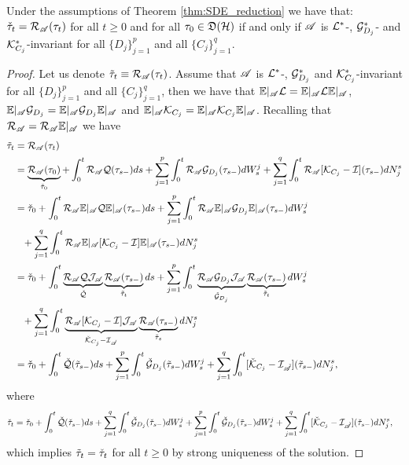 \documentclass[aihp,12pt]{imsart}
\begin{document}
\begin{proposition}
\label{thm:invariant_algebra}
    Under the assumptions of Theorem \ref{thm:SDE_reduction} we have that: $\check{\tau}_t = \mathcal{R}_{\mathscr{A}}(\tau_t)$ for all $t\geq0$ and for all $\tau_0\in\mathfrak{D}(\mathcal{H})$ if and only if $\mathscr{A}$ is  $\mathcal{L}^*$-, $\mathcal{G}_{D_j}^*$- and $\mathcal{K}_{C_j}^*$-invariant for all $\{D_j\}_{j=1}^p$ and all $\{C_j\}_{j=1}^q$. 
\end{proposition}
\begin{proof}
    Let us denote $\Tilde{\tau}_t \equiv \mathcal{R}_{\mathscr{A}}(\tau_t)$. Assume that $\mathscr{A}$ is $\mathcal{L}^*$-, $\mathcal{G}_{D_j}^*$ and $\mathcal{K}_{C_j}^*$-invariant for all $\{D_j\}_{j=1}^p$ and all $\{C_j\}_{j=1}^q$, then we have that $\mathbb{E}|_{\mathscr{A}}  \mathcal{L}  = \mathbb{E}|_{\mathscr{A}}  \mathcal{L}  \mathbb{E}|_{\mathscr{A}}$, $\mathbb{E}|_{\mathscr{A}} \mathcal{G}_{D_j} = \mathbb{E}|_{\mathscr{A}}\mathcal{G}_{D_j}\mathbb{E}|_{\mathscr{A}}$ and $\mathbb{E}|_{\mathscr{A}} \mathcal{K}_{C_j} = \mathbb{E}|_{\mathscr{A}}\mathcal{K}_{C_j}\mathbb{E}|_{\mathscr{A}}$. Recalling that $\mathcal{R}_{\mathscr{A}} = \mathcal{R}_{\mathscr{A}}\mathbb{E}|_{\mathscr{A}}$ we have 
    \begin{align*}
        \Tilde{\tau}_t&=\mathcal{R}_{\mathscr{A}}(\tau_t) \\&= \underbrace{\mathcal{R}_{\mathscr{A}}(\tau_0)}_{\check{\tau}_0} + \int_0^t \mathcal{R}_{\mathscr{A}}\mathcal{Q}(\tau_{s-}) ds + \sum_{j=1}^p \int_0^t \mathcal{R}_{\mathscr{A}}\mathcal{G}_{D_j}(\tau_{s-}) dW_s^j + \sum_{j=1}^q\int_0^t \mathcal{R}_{\mathscr{A}} [\mathcal{K}_{C_j}-\mathcal{I}](\tau_{s-}) dN_j^s\\
        &= \check{\tau}_0 + \int_0^t \mathcal{R}_{\mathscr{A}}\mathbb{E}|_{\mathscr{A}}\mathcal{Q}\mathbb{E}|_{\mathscr{A}}(\tau_{s-}) ds + \sum_{j=1}^p \int_0^t \mathcal{R}_{\mathscr{A}}\mathbb{E}|_{\mathscr{A}}\mathcal{G}_{D_j}\mathbb{E}|_{\mathscr{A}}(\tau_{s-}) dW_s^j \\&\hphantom{=}+ \sum_{j=1}^q\int_0^t \mathcal{R}_{\mathscr{A}} \mathbb{E}|_{\mathscr{A}} [\mathcal{K}_{C_j}-\mathcal{I}]\mathbb{E}|_{\mathscr{A}}(\tau_{s-}) dN_j^s\\
        &= \check{\tau}_0 + \int_0^t \underbrace{\mathcal{R}_{\mathscr{A}}\mathcal{Q} \mathcal{J}_{\mathscr{A}}}_{\check{\mathcal{Q}}}\underbrace{\mathcal{R}_{\mathscr{A}}(\tau_{s-})}_{\Tilde{\tau}_t} ds + \sum_{j=1}^p \int_0^t \underbrace{\mathcal{R}_{\mathscr{A}} \mathcal{G}_{D_j} \mathcal{J}_{\mathscr{A}}}_{\check{\mathcal{G}}_{D_j}}\underbrace{\mathcal{R}_{\mathscr{A}} (\tau_{s-})}_{\Tilde{\tau}_t} dW_s^j \\&\hphantom{=}+ \sum_{j=1}^q\int_0^t \underbrace{\mathcal{R}_{\mathscr{A}} [\mathcal{K}_{C_j}-\mathcal{I}]\mathcal{J}_{\mathscr{A}}}_{\check{\mathcal{K}}_{C_j}-\mathcal{I}_{\check{\mathscr{A}}}}\underbrace{\mathcal{R}_{\mathscr{A}}(\tau_{s-})}_{\Tilde{\tau}_s} dN_j^s\\
        &= \check{\tau}_0 + \int_0^t {\check{\mathcal{Q}}}({\Tilde{\tau}_{s-}}) ds + \sum_{j=1}^p \int_0^t {\check{\mathcal{G}}_{D_j}}({\Tilde{\tau}_{s-}}) dW_s^j + \sum_{j=1}^q\int_0^t [{\check{\mathcal{K}}_{C_j}-\mathcal{I}_{\check{\mathscr{A}}}}]({\Tilde{\tau}_{s-}}) dN_j^s,
    \end{align*}
    where 
    \begin{align*}
        \check{\tau}_t &= \check{\tau}_0 + \int_0^t {\check{\mathcal{Q}}}(\check{\tau}_{s-}) ds + \sum_{j=1}^q \int_0^t {\check{\mathcal{G}}_{D_j}}(\check{\tau}_{s-}) dW_s^j + \sum_{j=1}^p \int_0^t {\check{\mathcal{G}}_{D_j}}({\Tilde{\tau}_{s-}}) dW_s^j + \sum_{j=1}^q\int_0^t [{\check{\mathcal{K}}_{C_j}}-\mathcal{I}_{\check{\mathscr{A}}}]({\check{\tau}_{s-}}) dN_j^s,
    \end{align*}
    which implies $\Tilde{\tau}_t = \check{\tau}_t$ for all $t\geq0$ by strong uniqueness of the solution.


\end{proof}
\end{document}
